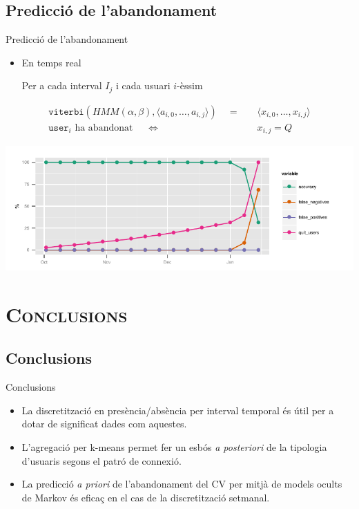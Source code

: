 \documentclass[xcolor=x11names,
								compress,
								aspectratio=1610]{beamer}
\newcommand{\mt}[1]{\texttt{#1}}
\theoremstyle{definition}%
\renewcommand{\(}{\begin{columns}}
\renewcommand{\)}{\end{columns}}
\newcommand{\<}[1]{\begin{column}{#1}}
\renewcommand{\>}{\end{column}}
\begin{document}
\subsection{Predicció de l'abandonament}
\begin{frame}{Predicció de l'abandonament}
			\begin{itemize}
			\item En temps real
			
			Per a cada interval $I_j$ i cada usuari $i$-èssim
			
			\end{itemize}
			
			\begin{align*}
			\mt{viterbi} (HMM(\alpha, \beta), \langle a_{i,0},\ldots, a_{i,j}\rangle) \quad = & \quad \langle x_{i,0},\ldots, x_{i,j} \rangle \\ 
			\mt{user}_i \text{ ha abandonat }  \quad \Leftrightarrow & \quad x_{i,j} = Q
 			\end{align*}
			\begin{center}
\includegraphics{hmm_weeks_confusion_m_day_pres}  
			\end{center}
\end{frame}

\section{\scshape Conclusions}
\subsection{Conclusions}
\begin{frame}{Conclusions}
	\begin{shaded}
	\begin{itemize}
		\item \large{
			La discretització en presència/absència per interval temporal és útil per a dotar de significat dades com aquestes.	
		}
		\vspace{1cm}
		\item \large{
			L'agregació per k-means permet fer un esbós \emph{a posteriori} de la tipologia d'usuaris segons el patró de connexió.
		}
		\vspace{1cm}
		\item \large{
			La predicció \emph{a priori} de l'abandonament del CV per mitjà de models ocults de Markov és eficaç en el cas de la discretització setmanal.
		}
	\end{itemize}
	\end{shaded}
\end{frame}
\end{document}

